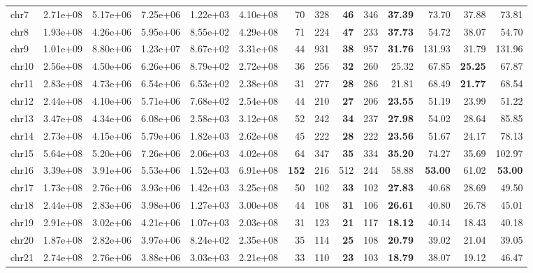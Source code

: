 \begin{table*}[!ht]
\begin{tabular}{@{}lrrrrrrrrrrrrr@{}}
		chr7 & 2.71e+08 & 5.17e+06 & 7.25e+06 & 1.22e+03 & 4.10e+08 & 70 & 328 & \textbf{46} & 346 & \textbf{37.39} & 73.70 & 37.88 & 73.81 \\ 
		chr8 & 1.93e+08 & 4.26e+06 & 5.95e+06 & 8.55e+02 & 4.29e+08 & 71 & 224 & \textbf{47} & 233 & \textbf{37.73} & 54.72 & 38.07 & 54.70 \\ 
		chr9 & 1.01e+09 & 8.80e+06 & 1.23e+07 & 8.67e+02 & 3.31e+08 & 44 & 931 & \textbf{38} & 957 & \textbf{31.76} & 131.93 & 31.79 & 131.96 \\ 
		chr10 & 2.56e+08 & 4.50e+06 & 6.26e+06 & 8.79e+02 & 2.72e+08 & 36 & 256 & \textbf{32} & 260 & 25.32 & 67.85 & \textbf{25.25} & 67.87 \\ 
		chr11 & 2.83e+08 & 4.73e+06 & 6.54e+06 & 6.53e+02 & 2.38e+08 & 31 & 277 & \textbf{28} & 286 & 21.81 & 68.49 & \textbf{21.77} & 68.54 \\ 
		chr12 & 2.44e+08 & 4.10e+06 & 5.71e+06 & 7.68e+02 & 2.54e+08 & 44 & 210 & \textbf{27} & 206 & \textbf{23.55} & 51.19 & 23.99 & 51.22 \\ 
		chr13 & 3.47e+08 & 4.34e+06 & 6.08e+06 & 2.58e+03 & 3.12e+08 & 52 & 242 & \textbf{34} & 237 & \textbf{27.98} & 54.02 & 28.64 & 85.85 \\ 
		chr14 & 2.73e+08 & 4.15e+06 & 5.79e+06 & 1.82e+03 & 2.62e+08 & 45 & 222 & \textbf{28} & 222 & \textbf{23.56} & 51.67 & 24.17 & 78.13 \\ 
		chr15 & 5.64e+08 & 5.20e+06 & 7.26e+06 & 2.06e+03 & 4.02e+08 & 64 & 347 & \textbf{35} & 334 & \textbf{35.20} & 74.27 & 35.69 & 102.97 \\ 
		chr16 & 3.39e+08 & 3.91e+06 & 5.53e+06 & 1.52e+03 & 6.91e+08 & \textbf{152} & 216 & 512 & 244 & 58.88 & \textbf{53.00} & 61.02 & \textbf{53.00} \\ 
		chr17 & 1.73e+08 & 2.76e+06 & 3.93e+06 & 1.42e+03 & 3.25e+08 & 50 & 102 & \textbf{33} & 102 & \textbf{27.83} & 40.68 & 28.69 & 49.50 \\ 
		chr18 & 2.44e+08 & 2.83e+06 & 3.98e+06 & 1.27e+03 & 3.00e+08 & 44 & 108 & \textbf{31} & 106 & \textbf{26.61} & 40.80 & 26.78 & 45.01 \\ 
		chr19 & 2.91e+08 & 3.02e+06 & 4.21e+06 & 1.07e+03 & 2.03e+08 & 31 & 123 & \textbf{21} & 117 & \textbf{18.12} & 40.14 & 18.43 & 40.18 \\ 
		chr20 & 1.87e+08 & 2.82e+06 & 3.97e+06 & 8.24e+02 & 2.35e+08 & 35 & 114 & \textbf{25} & 108 & \textbf{20.79} & 39.02 & 21.04 & 39.05 \\ 
		chr21 & 2.74e+08 & 2.76e+06 & 3.88e+06 & 3.03e+03 & 2.21e+08 & 33 & 110 & \textbf{23} & 103 & \textbf{18.79} & 38.07 & 19.12 & 46.47 \\ 

\end{tabular}
\end{table*}
